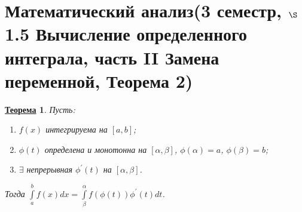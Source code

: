 \documentclass{article}
\newtheorem{theorem}{\underline{Теорема}}[section]
\begin{document}
	\section{Математический анализ(3 семестр, $\S$1.5 Вычисление определенного интеграла, часть II Замена переменной, Теорема 2)}

		\begin{theorem}
			Пусть:
			\begin{enumerate}
				\item $f(x)$ интегрируема на $[a,b]$;
				\item $\phi(t)$ определена и монотонна на $[\alpha,\beta]$, $\phi(\alpha)=a$, $\phi(\beta)=b$;
				\item $\exists$ непрерывная $\phi^\prime(t)$ на $[\alpha,\beta]$.
			\end{enumerate}
			Тогда $\int\limits^b_a f(x)dx = \int\limits^\alpha_\beta f(\phi(t))\phi^\prime(t)dt$.
		\end{theorem}
		
\end{document}
